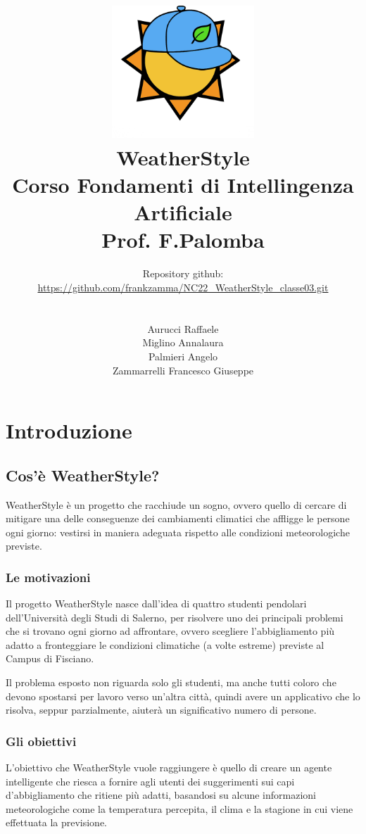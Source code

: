 \documentclass[a4paper, 11pt, oneside]{report}
\title{\includegraphics[width=0.4\textwidth]{logo}\\WeatherStyle\\Corso Fondamenti di Intellingenza Artificiale\\Prof. F.Palomba}
\author{Repository github:\\\url{https://github.com/frankzamma/NC22_WeatherStyle_classe03.git}\\\\
        \\Aurucci Raffaele\\Miglino Annalaura\\Palmieri Angelo\\Zammarrelli Francesco Giuseppe}
\date{}
\begin{document}
    \begin{titlepage}
        \maketitle
    \end{titlepage}

    \tableofcontents

    \part{Introduzione}
        \chapter{Cos'è WeatherStyle?}
            WeatherStyle è un progetto che racchiude un sogno, ovvero quello di cercare di mitigare una delle conseguenze
            dei cambiamenti climatici che affligge le persone ogni giorno: vestirsi in maniera adeguata rispetto alle condizioni
            meteorologiche previste.

            \section{Le motivazioni}
            Il progetto WeatherStyle nasce dall'idea di quattro studenti pendolari dell'Università degli Studi di Salerno, per
            risolvere uno dei principali problemi che si trovano ogni giorno ad affrontare, ovvero scegliere l'abbigliamento
            più adatto a fronteggiare le condizioni climatiche (a volte estreme) previste al Campus di Fisciano.
            \par \noindent Il problema esposto non riguarda solo gli studenti, ma anche tutti coloro che devono spostarsi per lavoro
            verso un'altra città, quindi avere un applicativo che lo risolva, seppur parzialmente,
            aiuterà un significativo numero di persone.

            \section{Gli obiettivi}
            L'obiettivo che WeatherStyle vuole raggiungere è quello di creare un agente intelligente che riesca a fornire
            agli utenti dei suggerimenti sui capi d'abbigliamento che ritiene più adatti, basandosi su alcune informazioni
            meteorologiche come la temperatura percepita, il clima e la stagione in cui viene effettuata la previsione.
\end{document}
